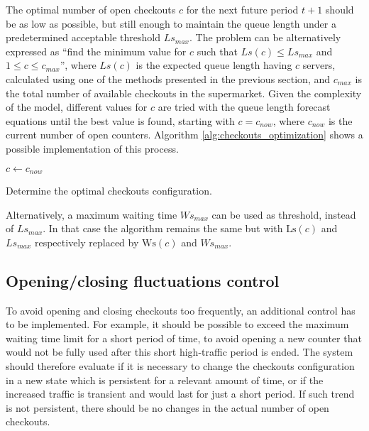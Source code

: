 The optimal number of open checkouts \( c \) for the next future period \( t+1 \) should be as low as possible, but still enough to maintain the queue length under a predetermined acceptable threshold \( Ls_{max} \). The problem can be alternatively expressed as “find the minimum value for \( c \) such that \( Ls(c) \leq Ls_{max} \) and \( 1 \leq c \leq c_{max} \)”, where \( Ls(c) \) is the expected queue length having \( c \) servers, calculated using one of the methods presented in the previous section, and \( c_{max} \) is the total number of available checkouts in the supermarket. Given the complexity of the model, different values for \( c \) are tried with the queue length forecast equations until the best value is found, starting with \( c = c_{now} \), where \( c_{now} \) is the current number of open counters. Algorithm \ref{alg:checkouts_optimization} shows a possible implementation of this process.
\begin{algorithm}
   \;
  $ c \gets c_{now}$\;
  \caption{\label{alg:checkouts_optimization}Determine the optimal checkouts configuration.}
\end{algorithm}

Alternatively, a maximum waiting time \( Ws_{max} \) can be used as threshold, instead of \( Ls_{max} \). In that case the algorithm remains the same but with \( \text{Ls}(c) \) and \( Ls_{max} \) respectively replaced by \( \text{Ws}(c) \) and \( Ws_{max} \).

\subsection{Opening/closing fluctuations control}
\label{subsec:opening_closing_fluctuations_control}

To avoid opening and closing checkouts too frequently, an additional control has to be implemented. For example, it should be possible to exceed the maximum waiting time limit for a short period of time, to avoid opening a new counter that would not be fully used after this short high-traffic period is ended. The system should therefore evaluate if it is necessary to change the checkouts configuration in a new state which is persistent for a relevant amount of time, or if the increased traffic is transient and would last for just a short period. If such trend is not persistent, there should be no changes in the actual number of open checkouts.

